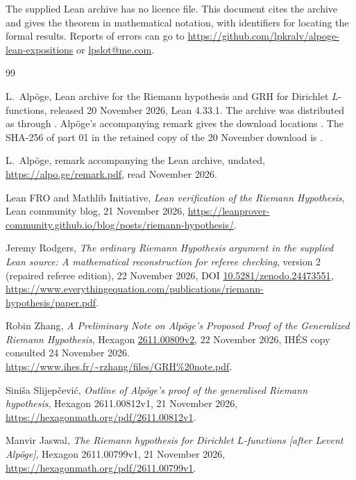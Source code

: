 \documentclass[11pt]{amsart}
\theoremstyle{definition}
\theoremstyle{remark}
\begin{document}
The supplied Lean archive has no licence file. This document cites the
archive and gives the theorem in mathematical notation, with identifiers for
locating the formal results. Reports of errors can go to
\url{https://github.com/lpkralv/alpoge-lean-expositions} or
\href{mailto:lpslot@me.com}{lpslot@me.com}.

\begin{thebibliography}{99}
\raggedright

L.~Alp\"oge, Lean archive for the Riemann hypothesis and GRH for Dirichlet
\(L\)-functions, released 20 November 2026, Lean 4.33.1.
The archive was distributed as  through
. Alp\"oge's accompanying remark gives the download
locations \cite{AlpogeRemark}. The SHA-256 of part 01 in the retained copy of
the 20 November download is
.

L.~Alp\"oge, remark accompanying the Lean archive, undated,
\url{https://alpo.ge/remark.pdf}, read November 2026.

Lean FRO and Mathlib Initiative, \emph{Lean verification of the Riemann
Hypothesis}, Lean community blog, 21 November 2026,
\url{https://leanprover-community.github.io/blog/posts/riemann-hypothesis/}.

Jeremy Rodgers, \emph{The ordinary Riemann Hypothesis argument in the supplied
Lean source: A mathematical reconstruction for referee checking}, version 2
(repaired referee edition), 22 November 2026,
DOI \href{https://doi.org/10.5281/zenodo.24473551}{10.5281/zenodo.24473551},
\url{https://www.everythingequation.com/publications/riemann-hypothesis/paper.pdf}.

Robin Zhang, \emph{A Preliminary Note on Alp\"oge's Proposed Proof of the
Generalized Riemann Hypothesis}, Hexagon
\href{https://hexagonmath.org/2611.00809v2}{2611.00809v2}, 22 November 2026,
IH\'ES copy consulted 24 November 2026.
\url{https://www.ihes.fr/~rzhang/files/GRH%20note.pdf}.

Sini\v{s}a Slijep\v{c}evi\'c, \emph{Outline of Alp\"oge's proof of the
generalised Riemann hypothesis}, Hexagon 2611.00812v1, 21 November 2026,
\url{https://hexagonmath.org/pdf/2611.00812v1}.

Manvir Jaswal, \emph{The Riemann hypothesis for Dirichlet \(L\)-functions
[after Levent Alp\"oge]}, Hexagon 2611.00799v1, 21 November 2026,
\url{https://hexagonmath.org/pdf/2611.00799v1}.


\end{thebibliography}
\end{document}
